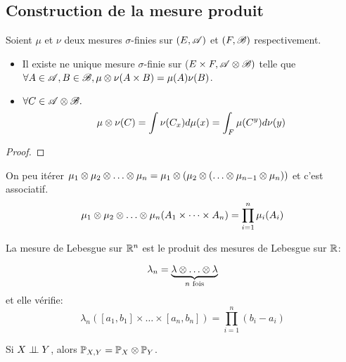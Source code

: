 \subsection{Construction de la mesure produit}

\begin{theorem}
	Soient $\mu$ et $\nu$ deux mesures $\sigma$-finies sur $(E, \mathscr{A})$ et $(F, \mathscr{B})$ respectivement.

	\begin{itemize}
		\item Il existe ne unique mesure $\sigma$-finie sur ($E \times F, \mathscr{A} \otimes \mathscr{B})$ telle que $\forall A \in \mathscr{A}, B \in \mathscr{B}, \mu \otimes \nu(A \times B) = \mu(A) \nu(B)$.
		\item $\forall C \in \mathscr{A} \otimes \mathscr{B}. $
		      $$ \mu \otimes \nu(C) = \int \nu(C_x) d \mu(x) = \int_F \mu(C^y) d \nu(y) $$
	\end{itemize}
\end{theorem}

\begin{proof}
\end{proof}

\begin{remarque}
	On peu itérer $\mu_1 \xor \mu_2 \xor \dots \xor \mu_n = \mu_1 \xor (\mu_2 \xor (\dots \xor \mu_{n-1} \xor \mu_n))$ et c'est associatif.
	$$ \mu_1 \xor \mu_2 \xor \dots \xor \mu_n(A_1 \times \dots \times A_n) = \prod_{i=1}^n \mu_i(A_i) $$
\end{remarque}


\begin{example}
	La mesure de Lebesgue sur $\mathbb{R}^n$ est le produit des mesures de Lebesgue sur $\mathbb{R}$:

	$$\lambda_n = \underbrace{\lambda \xor \dots \xor \lambda}_{n \text{ fois}}$$
	et elle vérifie:
	$$\lambda_n([a_1, b_1] \times \dots \times [a_n, b_n]) = \prod_{i=1}^n (b_i - a_i)$$
\end{example}

\begin{remarque}
	Si $X \perp\!\!\! \perp Y$, alors $\mathbb{P}_{X,Y} = \mathbb{P}_X \otimes \mathbb{P}_Y$.
\end{remarque}
